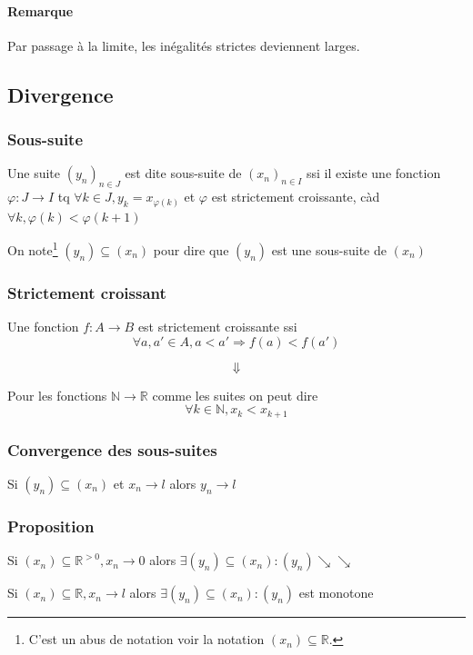\documentclass[a4paper,10pt]{article}
\newcommand{\ap}{\rightarrow}
\newcommand{\R}{\mathbb{R}}
\newcommand{\N}{\mathbb{N}}
\newcommand{\so}{\Rightarrow}
\begin{document}
\paragraph{Remarque} Par passage à la limite, les inégalités strictes deviennent larges.

\subsection{Divergence}

\subsubsection{Sous-suite}

Une suite $(y_n)_{n\in J}$ est dite sous-suite de $(x_n)_{n \in I}$ ssi il existe une fonction $\varphi : J \ap I$ tq $\forall k \in J, y_k = x_{\varphi(k)}$ et $\varphi$ est strictement croissante, càd $\forall k, \varphi(k) < \varphi(k+1)$

On note\footnote{C'est un abus de notation voir la notation $(x_n) \subseteq \R$.} $(y_n) \subseteq (x_n)$ pour dire que $(y_n)$ est une sous-suite de $(x_n)$

\subsubsection{Strictement croissant}

Une fonction $f : A \ap B$ est strictement croissante ssi $$\forall a,a' \in A, a < a' \so f(a) < f(a')$$

$$\Downarrow$$

Pour les fonctions $\N \ap \R$ comme les suites on peut dire $$\forall k \in \N, x_k < x_{k+1}$$

\subsubsection{Convergence des sous-suites}

Si $(y_n) \subseteq (x_n)$ et $x_n \ap l$ alors $y_n \ap l$

\subsubsection{Proposition}

Si $(x_n) \subseteq \R^{>0}, x_n \ap 0$ alors $\exists (y_n) \subseteq (x_n) : (y_n) \searrow \searrow$

Si $(x_n) \subseteq \R, x_n \ap l$ alors $\exists (y_n) \subseteq (x_n) : (y_n)$ est monotone
\end{document}
